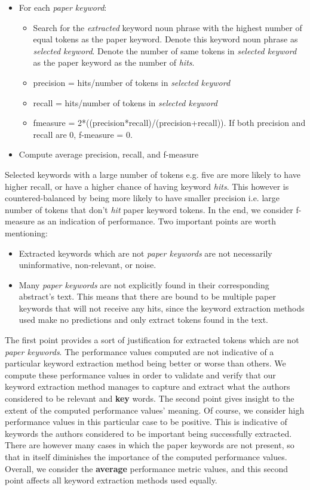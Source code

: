 \documentclass[12pt]{article}
\begin{document}
\begin{itemize}
\item For each \textit{paper keyword}:
\begin{itemize}
  \item Search for the \textit{extracted} keyword noun phrase with the highest number of equal tokens as the paper keyword.
  Denote this keyword noun phrase as \textit{selected keyword}. Denote the number of same tokens in \textit{selected keyword} as the
  paper keyword as the number of \textit{hits}.
  \item precision = hits/number of tokens in \textit{selected keyword}
  \item recall = hits/number of tokens in \textit{selected keyword}
  \item fmeasure = 2*((precision*recall)/(precision+recall)). If both precision and recall are 0, f-measure = 0.
\end{itemize}
\item Compute average precision, recall, and f-measure
\end{itemize}

Selected keywords with a large number of tokens e.g. five are more likely to have higher recall, or have a higher chance of having keyword \textit{hits}.
This however is countered-balanced by being more likely to have smaller precision i.e. large number of tokens that don't \textit{hit}
paper keyword tokens. In the end, we consider f-measure as an indication of performance. Two important points are worth mentioning:
\begin{itemize}
\item Extracted keywords which are not \textit{paper keywords} are not necessarily uninformative, non-relevant, or noise.
\item Many \textit{paper keywords} are not explicitly found in their corresponding abstract's text. This means that there are bound to be multiple
paper keywords that will not receive any hits, since the keyword extraction methods used make no predictions and only extract tokens found in the text.
\end{itemize}

The first point provides a sort of justification for extracted tokens which are not \textit{paper keywords}.
The performance values computed are not indicative of a particular keyword extraction method being better or worse than others. We compute these
performance values in order to validate and verify that our keyword extraction method manages to capture and extract what the authors considered to
be relevant and \textbf{key} words. The second point gives insight to the extent of the computed performance values' meaning. Of course, we consider high performance
values in this particular case to be positive. This is indicative of keywords the authors considered to be important being successfully extracted. There are
however many cases in which the paper keywords are not present, so that in itself diminishes the importance of the computed performance values.
Overall, we consider the \textbf{average} performance metric values, and this second point affects all keyword extraction methods used equally.
\end{document}
